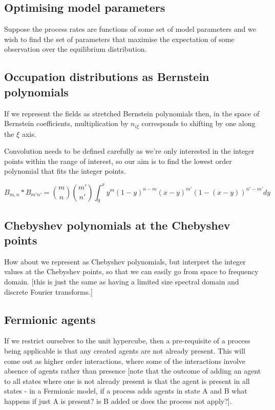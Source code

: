 \documentclass[a4paper]{article}
\begin{document}
\subsection{Optimising model parameters}

Suppose the process rates are functions of some set of model parameters and we wish to find the set of parameters that maximise the expectation of some observation over the equilibrium distribution. 


\subsection{Occupation distributions as Bernstein polynomials}
If we represent the fields as stretched Bernstein polynomials then, in the space of Bernstein coefficients, multiplication by $n_{i\xi}$ corresponds to shifting by one along the $\xi$ axis.

Convolution needs to be defined carefully as we're only interested in the integer points within the range of interest, so our aim is to find the lowest order polynomial that fits the integer points.

\[
B_{m,n} \ast B_{m'n'} =   {m \choose n}{m' \choose n'} \int_{0}^x y^m(1-y)^{n-m} (x-y)^{m'}(1-(x-y))^{n'-m'} dy
\]

\subsection{Chebyshev polynomials at the Chebyshev points}
How about we represent as Chebyshev polynomials, but interpret the integer values at the Chebyshev points, so that we can easily go from space to frequency domain. [this is just the same as having a limited size spectral domain and discrete Fourier transforms.]

\subsection{Fermionic agents}

If we restrict ourselves to the unit hypercube, then a pre-requisite of a process being applicable is that any created agents are not already present. This will come out as higher order interactions, where some of the interactions involve absence of agents rather than presence [note that the outcome of adding an agent to all states where one is not already present is that the agent is present in all states - in a Fermionic model, if a process adds agents in state A and B what happens if just A is present? is B added or does the process not apply?].
\end{document}
